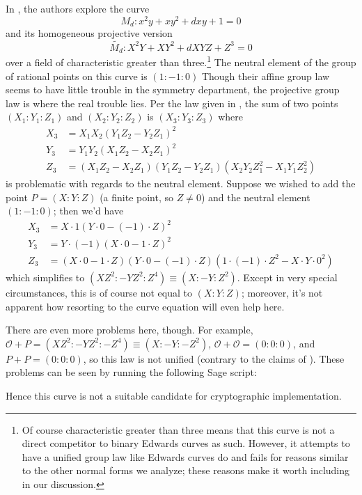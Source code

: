 
In \cite{wang2012new}, the authors explore the curve
\[
M_d: x^2y + xy^2 + dxy + 1 = 0
\]
    and its homogeneous projective version
\[
\widetilde{M_d}: X^2Y + XY^2 + dXYZ + Z^3 = 0
\]
    over a field of characteristic greater than three.\footnote{Of course
    characteristic greater than three means that this curve is not a direct
    competitor to binary Edwards curves as such. However, it attempts to have
    a unified group law like Edwards curves do and fails for reasons similar
    to the other normal forms we analyze; these reasons make it worth including
    in our discussion.}
The neutral element of the group of rational points on this curve is
    $(1 : -1 : 0)$
Though their affine group law seems to have little trouble in the symmetry
    department, the projective group law is where the real trouble lies.
Per the law given in \cite{wang2012new}, the sum of two points $(X_1 : Y_1 :
    Z_1)$ and $(X_2 : Y_2 : Z_2)$ is $ (X_3 : Y_3 : Z_3)$ where
\begin{align*}
X_3 &=  X_1X_2(Y_1Z_2 - Y_2Z_1)^2\\
Y_3 &=  Y_1Y_2(X_1Z_2 - X_2Z_1)^2\\
Z_3 &=  (X_1Z_2 - X_2Z_1)(Y_1Z_2 - Y_2Z_1)(X_2Y_2Z_1^2 - X_1Y_1Z_2^2)
\end{align*}
    is problematic with regards to the neutral element.
Suppose we wished to add the point $P = (X : Y : Z)$ (a finite point, so $Z \ne
    0$) and the neutral element $(1 : -1 : 0)$; then we'd have
\begin{align*}
X_3 &=  X \cdot 1 (Y \cdot 0 - (-1) \cdot Z)^2\\
Y_3 &=  Y \cdot (-1) (X \cdot 0 - 1 \cdot Z)^2\\
Z_3 &=  (X \cdot 0 - 1 \cdot Z)(Y \cdot 0 - (-1) \cdot Z)
    (1 \cdot (-1) \cdot Z^2 - X \cdot Y \cdot 0^2)
\end{align*}
    which simplifies to $(XZ^2 : -YZ^2 : Z^4) \equiv (X : -Y : Z^2)$.
Except in very special circumstances, this is of course not equal to
    $(X : Y : Z)$; moreover, it's not apparent how resorting to the curve
    equation will even help here.

There are even more problems here, though.
For example, $\mathcal{O} + P = (XZ^2 : -YZ^2 : -Z^4) \equiv (X : -Y : -Z^2)$,
    $\mathcal{O} + \mathcal{O} = (0 : 0 : 0)$, and $P + P = (0 : 0 : 0)$, so
    this law is not unified (contrary to the claims of \cite{wang2012new}).
These problems can be seen by running the following Sage \cite{sage} script:

Hence this curve is not a suitable candidate for cryptographic implementation.


